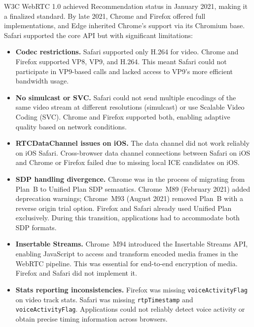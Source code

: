 \documentclass[11pt]{article}
\begin{document}
W3C WebRTC 1.0 achieved Recommendation status in January 2021, making it a
finalized standard. By late 2021, Chrome and Firefox offered full
implementations, and Edge inherited Chrome's support via its Chromium base.
Safari supported the core API but with significant limitations:

\begin{itemize}
  \item \textbf{Codec restrictions.} Safari supported only H.264 for video.
    Chrome and Firefox supported VP8, VP9, and H.264. This meant Safari could
    not participate in VP9-based calls and lacked access to VP9's more
    efficient bandwidth usage.
  \item \textbf{No simulcast or SVC.} Safari could not send multiple
    encodings of the same video stream at different resolutions (simulcast)
    or use Scalable Video Coding (SVC). Chrome and Firefox supported both,
    enabling adaptive quality based on network conditions.
  \item \textbf{RTCDataChannel issues on iOS.} The data channel did not work
    reliably on iOS Safari. Cross-browser data channel connections between
    Safari on iOS and Chrome or Firefox failed due to missing local ICE
    candidates on iOS.
  \item \textbf{SDP handling divergence.} Chrome was in the process of
    migrating from Plan~B to Unified Plan SDP semantics. Chrome~M89
    (February 2021) added deprecation warnings; Chrome~M93 (August 2021)
    removed Plan~B with a reverse origin trial option. Firefox and Safari
    already used Unified Plan exclusively. During this transition, applications
    had to accommodate both SDP formats.
  \item \textbf{Insertable Streams.} Chrome~M94 introduced the
    Insertable Streams API, enabling JavaScript to access and transform
    encoded media frames in the WebRTC pipeline. This was essential for
    end-to-end encryption of media. Firefox and Safari did not implement it.
  \item \textbf{Stats reporting inconsistencies.} Firefox was missing
    \texttt{voice\-Activity\-Flag} on video track stats. Safari was missing
    \texttt{rtpTimestamp} and \texttt{voiceActivityFlag}. Applications could
    not reliably detect voice activity or obtain precise timing information
    across browsers.
\end{itemize}
\end{document}
